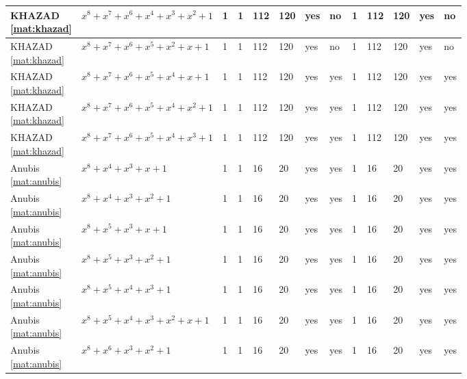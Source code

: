 \begin{tiny}
\begin{longtable}{|l|l|l|l|l|l|l|l|l|l|l|l|l|}
\shortstack{KHAZAD \\ \eqref{mat:khazad}} & $x^8 + x^7 + x^6 + x^4 + x^3 + x^2 + 1$ & 1 & 1 & 112 & 120 & yes & no & 1 & 112 & 120 & yes & no \\ \hline
\shortstack{KHAZAD \\ \eqref{mat:khazad}} & $x^8 + x^7 + x^6 + x^5 + x^2 + x + 1$ & 1 & 1 & 112 & 120 & yes & no & 1 & 112 & 120 & yes & no \\ \hline
\shortstack{KHAZAD \\ \eqref{mat:khazad}} & $x^8 + x^7 + x^6 + x^5 + x^4 + x + 1$ & 1 & 1 & 112 & 120 & yes & yes & 1 & 112 & 120 & yes & yes \\ \hline
\shortstack{KHAZAD \\ \eqref{mat:khazad}} & $x^8 + x^7 + x^6 + x^5 + x^4 + x^2 + 1$ & 1 & 1 & 112 & 120 & yes & yes & 1 & 112 & 120 & yes & yes \\ \hline
\shortstack{KHAZAD \\ \eqref{mat:khazad}} & $x^8 + x^7 + x^6 + x^5 + x^4 + x^3 + 1$ & 1 & 1 & 112 & 120 & yes & yes & 1 & 112 & 120 & yes & yes \\ \hline
\shortstack{Anubis \\ \eqref{mat:anubis}} & $x^8 + x^4 + x^3 + x + 1$ & 1 & 1 & 16 & 20 & yes & yes & 1 & 16 & 20 & yes & yes \\ \hline
\shortstack{Anubis \\ \eqref{mat:anubis}} & $x^8 + x^4 + x^3 + x^2 + 1$ & 1 & 1 & 16 & 20 & yes & yes & 1 & 16 & 20 & yes & yes \\ \hline
\shortstack{Anubis \\ \eqref{mat:anubis}} & $x^8 + x^5 + x^3 + x + 1$ & 1 & 1 & 16 & 20 & yes & yes & 1 & 16 & 20 & yes & yes \\ \hline
\shortstack{Anubis \\ \eqref{mat:anubis}} & $x^8 + x^5 + x^3 + x^2 + 1$ & 1 & 1 & 16 & 20 & yes & yes & 1 & 16 & 20 & yes & yes \\ \hline
\shortstack{Anubis \\ \eqref{mat:anubis}} & $x^8 + x^5 + x^4 + x^3 + 1$ & 1 & 1 & 16 & 20 & yes & yes & 1 & 16 & 20 & yes & yes \\ \hline
\shortstack{Anubis \\ \eqref{mat:anubis}} & $x^8 + x^5 + x^4 + x^3 + x^2 + x + 1$ & 1 & 1 & 16 & 20 & yes & yes & 1 & 16 & 20 & yes & yes \\ \hline
\shortstack{Anubis \\ \eqref{mat:anubis}} & $x^8 + x^6 + x^3 + x^2 + 1$ & 1 & 1 & 16 & 20 & yes & yes & 1 & 16 & 20 & yes & yes \\ \hline

\end{longtable}
\end{tiny}
